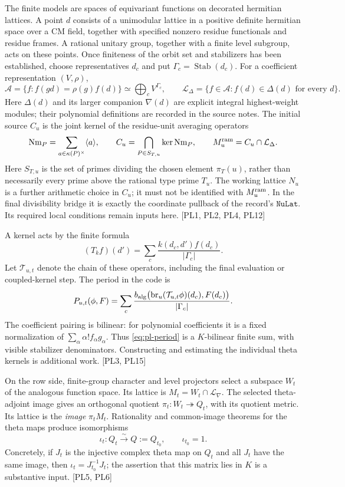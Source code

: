 \documentclass[11pt,a4paper]{article}
\numberwithin{equation}{section}
\theoremstyle{remark}\newtheorem{remark}[theorem]{Remark}
\begin{document}
The finite models are spaces of equivariant functions on decorated hermitian lattices. A point $d$ consists of a unimodular lattice in a positive definite hermitian space over a CM field, together with specified nonzero residue functionals and residue frames. A rational unitary group, together with a finite level subgroup, acts on these points. Once finiteness of the orbit set and stabilizers has been established, choose representatives $d_c$ and put $\Gamma_c=\operatorname{Stab}(d_c)$. For a coefficient representation $(V,\rho)$,
\[
 \mathcal A=\{f:f(gd)=\rho(g)f(d)\}
       \simeq\bigoplus_c V^{\Gamma_c},\qquad
 \mathcal L_{\Delta}=\{f\in\mathcal A:f(d)\in\Delta(d)\text{ for every }d\}.
\]
Here $\Delta(d)$ and its larger companion $\nabla(d)$ are explicit integral highest-weight modules; their polynomial definitions are recorded in the source notes. The initial source $C_u$ is the joint kernel of the residue-unit averaging operators
\[
 \operatorname{Nm}_P=\sum_{a\in\kappa(P)^\times}\langle a\rangle,
 \qquad C_u=\bigcap_{P\in S_{T,u}}\ker\operatorname{Nm}_P,
 \qquad M_u^{\rm ram}=C_u\cap\mathcal L_{\Delta}.
\]
Here $S_{T,u}$ is the set of primes dividing the chosen element $\pi_T(u)$, rather than necessarily every prime above the rational type prime $T_u$. The working lattice $N_u$ is a further arithmetic choice in $C_u$; it must not be identified with $M_u^{\rm ram}$. In the final divisibility bridge it is exactly the coordinate pullback of the record's $\texttt{NuLat}$. Its required local conditions remain inputs here. \textsf{[PL1, PL2, PL4, PL12]}

A kernel acts by the finite formula
\[
 (T_kf)(d')=\sum_c\frac{k(d_c,d')f(d_c)}{|\Gamma_c|}.
\]
Let $\mathcal T_{u,t}$ denote the chain of these operators, including the final evaluation or coupled-kernel step. The period in the code is
\begin{equation}\label{eq:pl-period}
 P_{u,t}(\phi,F)=\sum_c\frac{
 b_{\rm alg}\bigl(\operatorname{br}_u(\mathcal T_{u,t}\phi)(d_c),F(d_c)\bigr)}{|\Gamma_c|}.
\end{equation}
The coefficient pairing is bilinear: for polynomial coefficients it is a fixed normalization of $\sum_\alpha\alpha!f_\alpha g_\alpha$. Thus \eqref{eq:pl-period} is a $K$-bilinear finite sum, with visible stabilizer denominators. Constructing and estimating the individual theta kernels is additional work. \textsf{[PL3, PL15]}

On the row side, finite-group character and level projectors select a subspace $W_t$ of the analogous function space. Its lattice is
$M_t=W_t\cap\mathcal L_{\nabla}$. The selected theta-adjoint image gives an orthogonal quotient $\pi_t:W_t\twoheadrightarrow Q_t$, with its quotient metric. Its lattice is the \emph{image} $\pi_tM_t$. Rationality and common-image theorems for the theta maps produce isomorphisms
\[
 \iota_t:Q_t\overset\sim\longrightarrow Q:=Q_{t_0},
 \qquad \iota_{t_0}=1.
\]
Concretely, if $J_t$ is the injective complex theta map on $Q_t$ and all $J_t$ have the same image, then $\iota_t=J_{t_0}^{-1}J_t$; the assertion that this matrix lies in $K$ is a substantive input. \textsf{[PL5, PL6]}
\end{document}

